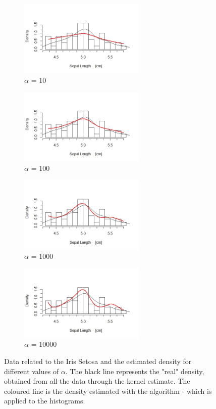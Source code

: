 \begin{figure}[ht]
	
	\begin{subfigure}{.5\textwidth}
		\includegraphics[width=6cm]{./pictures/iris/setosa_10.jpeg} 
		\caption*{$\alpha$ = 10}
		\label{fig:alpha10e1}
	\end{subfigure}
	\begin{subfigure}{.5\textwidth}
		\includegraphics[width=6cm]{./pictures/iris/setosa_100.jpeg}
		\caption*{$\alpha$ = 100}
		\label{fig:alpha10e2}
	\end{subfigure}

	\begin{subfigure}{.5\textwidth}
		\includegraphics[width=6cm]{./pictures/iris/setosa_1000.jpeg} 
		\caption*{$\alpha$ = 1000}
		\label{fig:alpha10e3}
	\end{subfigure}
	\begin{subfigure}{.5\textwidth}
		\includegraphics[width=6cm]{./pictures/iris/setosa_10000.jpeg}
		\caption*{$\alpha$ = 10000}
		\label{fig:alpha10e4}
	\end{subfigure}
	\caption{Data related to the Iris Setosa and the estimated density for different values of $\alpha$. The black line represents the "real" density, obtained from all the data through the kernel estimate. The coloured line is the density estimated with the algorithm - which is applied to the histograms.}
	\label{fig:setosa}
	
\end{figure}

